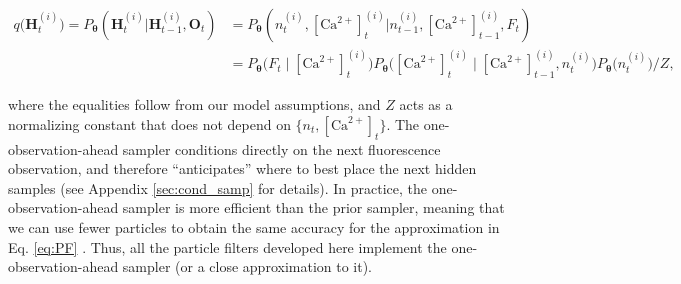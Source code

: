 \documentclass[10pt]{article}
\providecommand{\ve}[1]{\boldsymbol{#1}}
\providecommand{\ve}[1]{\boldsymbol{#1}}
\newcommand{\thetn}{\ve{\theta}}
\newcommand{\p}{P_{\thetn}}
\newcommand{\q}{q\big(\ve{H}_t^{(i)}\big)}
\newcommand{\Ca}{[\text{Ca}^{2+}]}
\begin{document}
\begin{align} \label{eq:SAMP}
\q=\p(\ve{H}_t^{(i)} | \ve{H}_{t-1}^{(i)}, \ve{O}_t) & =
\p (n_t^{(i)},\Ca_t^{(i)} | n_{t-1}^{(i)}, \Ca_{t-1}^{(i)}, F_t)
\nonumber \\ &= \p \big( F_t \mid \Ca_t^{(i)} \big) \p \big( \Ca_t^{(i)}   \mid \Ca^{(i)}_{t-1}, n_t^{(i)} \big)  \p \big( n_t^{(i)} \big)/Z, 
\end{align}

\noindent where the equalities follow from our model assumptions, and $Z$ acts as a normalizing constant that does not depend on $\{n_t, \Ca_t\}$. The one-observation-ahead sampler conditions directly on the next fluorescence observation, and therefore ``anticipates'' where to best place the next hidden samples (see Appendix \ref{sec:cond_samp} for details). In practice, the one-observation-ahead sampler is more efficient than the prior sampler, meaning that we can use fewer particles to obtain the same accuracy for the approximation in Eq. \ref{eq:PF} \cite{DoucetGordon01}. Thus, all the particle filters developed here implement the one-observation-ahead sampler (or a close approximation to it).

%
\end{document}
